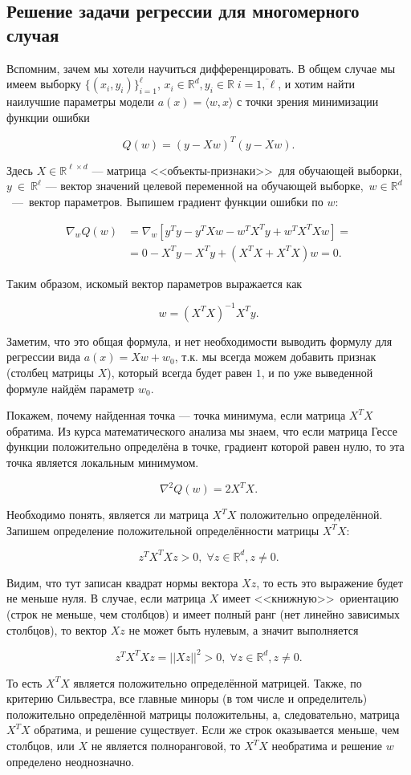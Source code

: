 \documentclass[12pt,fleqn]{article}
\begin{document}
\subsection{Решение задачи регрессии для многомерного случая}

Вспомним, зачем мы хотели научиться дифференцировать. В общем случае мы имеем выборку $\{(x_i, y_i)\}_{i=1}^\ell$, $x_i \in \mathbb{R}^d, y_i \in \mathbb{R} \; i = \overline{1, \ell}$, и хотим найти наилучшие параметры модели $a(x) = \langle w, x \rangle$ с точки зрения минимизации функции ошибки

$$Q(w) = (y - Xw)^T(y - Xw).$$

Здесь $X\in \mathbb{R}^{\ell \times d}$ — матрица <<объекты-признаки>>\ для обучающей выборки, $y~\in~\mathbb{R}^\ell$ — вектор значений целевой переменной на обучающей выборке,~$w \in \mathbb{R}^d$~—~вектор параметров. Выпишем градиент функции ошибки по $w$:

\begin{align*}
\nabla_w Q(w) & = \nabla_w [y^Ty - y^TXw - w^TX^Ty + w^TX^TXw] = \\
& = 0 - X^Ty - X^Ty + (X^TX + X^TX)w = 0.
\end{align*}

Таким образом, искомый вектор параметров выражается как

\[
w = (X^TX)^{-1}X^Ty.
\]

Заметим, что это общая формула, и нет необходимости выводить формулу для регрессии вида $a(x) = Xw + w_0$, т.к. мы всегда можем добавить признак (столбец матрицы $X$), который всегда будет равен $1$, и по уже выведенной формуле найдём параметр $w_0$.

Покажем, почему найденная точка — точка минимума, если матрица $X^T X$ обратима. Из курса математического анализа мы знаем, что если матрица Гессе функции положительно определёна в точке, градиент которой равен нулю, то эта точка является локальным минимумом.

\[
\nabla^2 Q(w) = 2X^TX.
\]

Необходимо понять, является ли матрица $X^TX$ положительно определённой. Запишем определение положительной определённости матрицы  $X^TX$:

\[
z^TX^TXz > 0, \; \forall z \in \mathbb{R}^d, z \ne 0.
\]

Видим, что тут записан квадрат нормы вектора $Xz$, то есть это выражение будет не меньше нуля. В случае, если матрица $X$ имеет <<книжную>>\ ориентацию (строк не меньше, чем столбцов) и имеет полный ранг (нет линейно зависимых столбцов), то вектор $Xz$ не может быть нулевым, а значит выполняется

\[
z^TX^TXz = ||Xz||^2 > 0, \; \forall z \in \mathbb{R}^d, z \ne 0.
\]

То есть $X^TX$ является положительно определённой матрицей. Также, по критерию Сильвестра, все главные миноры (в том числе и определитель) положительно определённой матрицы положительны, а, следовательно, матрица $X^TX$ обратима, и решение существует. Если же строк оказывается меньше, чем столбцов, или $X$ не является полноранговой, то $X^TX$ необратима и решение $w$ определено неоднозначно. 
\end{document}
